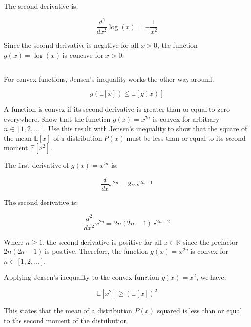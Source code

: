 \documentclass[12pt]{report}
\begin{document}
The second derivative is:

\begin{equation*}
    \frac{d^{2}}{dx^{2}} \log(x) = -\frac{1}{x^{2}}
\end{equation*}

Since the second derivative is negative for all $x > 0$, the function $g(x) = \log(x)$ is concave for $x > 0$.
\newpage

\subsection{}
\begin{mdframed}
    For convex functions, Jensen's inequality works the other way around.

    \begin{equation*}
        g(\mathbb{E}[x]) \leq \mathbb{E}[g(x)]
        \tag{17.31}
    \end{equation*}

    A function is convex if its second derivative is greater than or equal to zero everywhere. Show that the function $g(x) = x^{2n}$ is convex for arbitrary $n \in [1,2, \dots]$. Use this result with Jensen's inequality to show that the square of the mean $\mathbb{E}[x]$ of a distribution $P(x)$ must be less than or equal to its second moment $\mathbb{E}[x^{2}]$.
\end{mdframed}

The first derivative of $g(x) = x^{2n}$ is:

\begin{equation*}
    \frac{d}{dx} x^{2n} = 2nx^{2n-1}
\end{equation*}

The second derivative is:

\begin{equation*}
    \frac{d^{2}}{dx^{2}} x^{2n} = 2n(2n-1)x^{2n-2}
\end{equation*}

Where $n \geq 1$, the second derivative is positive for all $x \in \mathbb{R}$ since the prefactor $2n(2n-1)$ is positive. Therefore, the function $g(x) = x^{2n}$ is convex for $n \in [1,2, \dots]$.

Applying Jensen's inequality to the convex function $g(x) = x^{2}$, we have:

\begin{equation*}
    \mathbb{E}[x^{2}] \geq \left( \mathbb{E}[x] \right)^{2}
\end{equation*}

This states that the mean of a distribution $P(x)$ squared is less than or equal to the second moment of the distribution.
\end{document}
